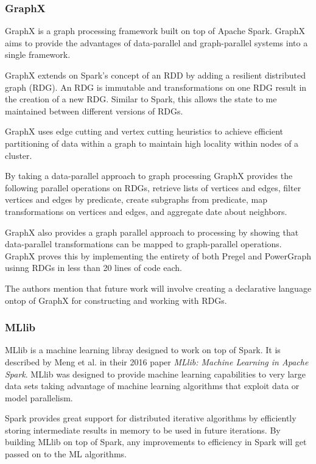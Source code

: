 \documentclass[]{article}
\begin{document}
\subsubsection{GraphX}
GraphX\cite{xin_graphx:_2013} is a graph processing framework built on top of Apache Spark. GraphX aims to provide the advantages of data-parallel and graph-parallel systems into a single framework.

GraphX extends on Spark's concept of an RDD by adding a resilient distributed graph (RDG). An RDG is immutable and transformations on one RDG result in the creation of a new RDG. Similar to Spark, this allows the state to me maintained between different versions of RDGs.

GraphX uses edge cutting and vertex cutting heuristics to achieve efficient partitioning of data within a graph to maintain high locality within nodes of a cluster.

By taking a data-parallel approach to graph processing GraphX provides the following parallel operations on RDGs, retrieve lists of vertices and edges, filter vertices and edges by predicate, create subgraphs from predicate, map transformations on vertices and edges, and aggregate date about neighbors.

GraphX also provides a graph parallel approach to processing by showing that data-parallel transformations can be mapped to graph-parallel operations. GraphX proves this by implementing the entirety of both Pregel and PowerGraph usinng RDGs in less than 20 lines of code each.

The authors mention that future work will involve creating a declarative language ontop of GraphX for constructing and working with RDGs.

\subsubsection{MLlib}
MLlib is a machine learning libray designed to work on top of Spark. It is described by Meng et al. in their 2016 paper \textit{MLlib: Machine Learning in Apache Spark}\cite{meng2016mllib}. MLlib was designed to provide machine learning capabilities to very large data sets taking advantage of machine learning algorithms that exploit data or model parallelism.

Spark provides great support for distributed iterative algorithms by efficiently storing intermediate results in memory to be used in future iterations. By building MLlib on top of Spark, any improvements to efficiency in Spark will get passed on to the ML algorithms.
\end{document}
